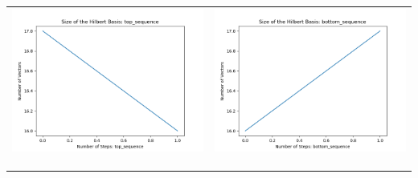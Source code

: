 \documentclass[10pt]{article}
\begin{document}
\begin{tabular}{c|c}
\begin{minipage}{.4\textwidth}
\includegraphics[width=\textwidth]{"DATA/5d/6 generators 1 bound B/top_sequence SIZE"}
\end{minipage} &
\begin{minipage}{.4\textwidth}
\includegraphics[width=\textwidth]{"DATA/5d/6 generators 1 bound B bottomup/bottom_sequence SIZE"}
\end{minipage} \\ \\
\hline \\\begin{minipage}{.4\textwidth}

\end{minipage}
\end{tabular}
\end{document}
